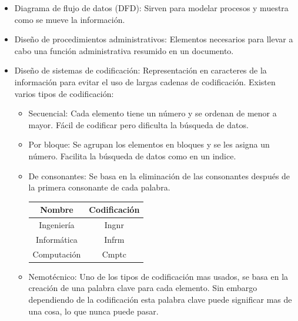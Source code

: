 \documentclass{templateNote}
\begin{document}
\begin{itemize}
        \begin{itemize}
            \item Diagrama de flujo de datos (DFD): Sirven para modelar procesos y muestra como se mueve la información.
            \item Diseño de procedimientos administrativos: Elementos necesarios para llevar a cabo una función administrativa resumido en un documento.
            \item Diseño de sistemas de codificación: Representación en caracteres de la información para evitar el uso de largas cadenas de codificación. Existen varios tipos de codificación:
            \begin{itemize}
                \item Secuencial: Cada elemento tiene un número y se ordenan de menor a mayor. Fácil de codificar pero dificulta la búsqueda de datos.
                \item Por bloque: Se agrupan los elementos en bloques y se les asigna un número. Facilita la búsqueda de datos como en un indice.
                \item De consonantes: Se basa en la eliminación de las consonantes después de la primera consonante de cada palabra.
                \begin{tcolorbox}[colback=green!10!white,colframe=green!75!black,title=Ejemplo de codificación de consonantes]
                    \begin{center}
                        \begin{tabular}{|c|c|}
                            \hline
                            \textbf{Nombre} & \textbf{Codificación} \\ \hline
                            Ingeniería & Ingnr \\ \hline
                            Informática & Infrm \\ \hline
                            Computación & Cmptc \\ \hline
                        \end{tabular}
                    \end{center}
                \end{tcolorbox}
                \item Nemotécnico: Uno de los tipos de codificación mas usados, se basa en la creación de una palabra clave para cada elemento.
                Sin embargo dependiendo de la codificación esta palabra clave puede significar mas de una cosa, lo que nunca puede pasar.
                \begin{tcolorbox}[colback=green!10!white,colframe=green!75!black,title=Ejemplo de codificación Nemotécnica]

\end{tcolorbox}
\end{itemize}
\end{itemize}
\end{itemize}
\end{document}
